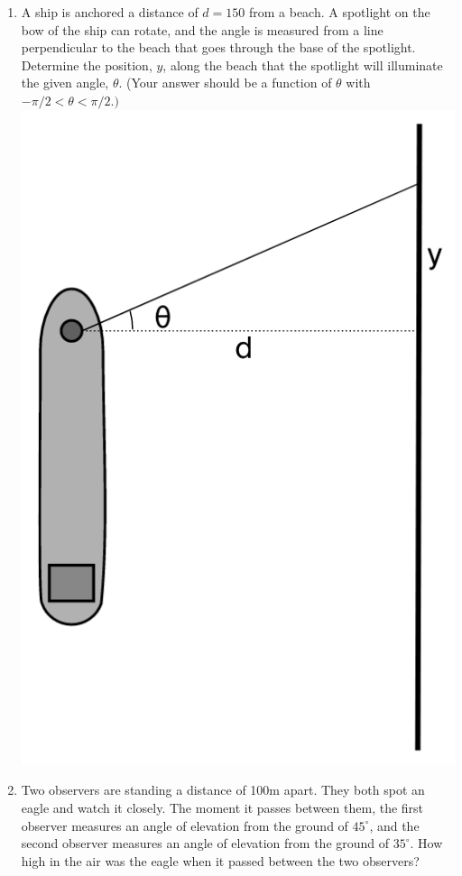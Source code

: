 \begin{enumerate}
\newpage
\item A ship is anchored a distance of $d=150$ from a beach.  A spotlight on the bow of the ship can rotate, and the angle is measured from a line perpendicular to the beach that goes through the base of the spotlight.  Determine the position, $y$, along the beach that the spotlight will illuminate the given angle, $\theta$.  (Your answer should be a function of $\theta$ with $-\pi/2<\theta <\pi/2.)$\\
\includegraphics[scale=.4]{ship1}\\

\item Two observers are standing a distance of 100m apart.  They both spot an eagle and watch it closely.  The moment it passes between them, the first observer measures an angle of elevation from the ground of $45^\circ$, and the second observer measures an angle of elevation from the ground of $35^\circ.$  How high in the air was the eagle when it passed between the two observers?\vfill
\vfill





\end{enumerate}
